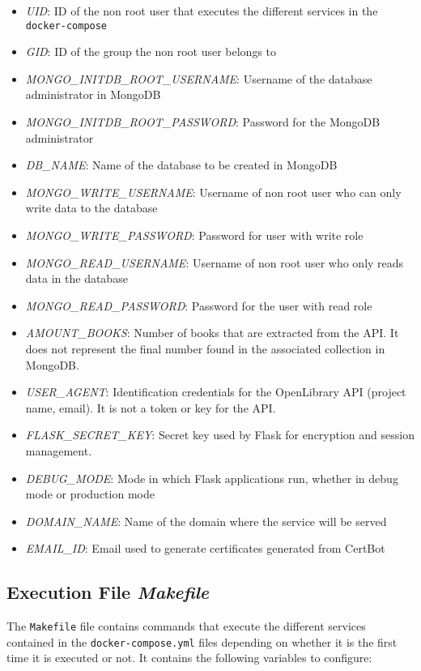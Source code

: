 \documentclass[12pt,a4paper]{article}
\begin{document}
{{            \begin{itemize}[label=$\bullet$]
                \item \emph{UID}: ID of the non root user that executes the different services in the \verb*|docker-compose|
                \item \emph{GID}: ID of the group the non root user belongs to
                \item \emph{MONGO\_INITDB\_ROOT\_USERNAME}: Username of the database administrator in MongoDB
                \item \emph{MONGO\_INITDB\_ROOT\_PASSWORD}: Password for the MongoDB administrator
                \item \emph{DB\_NAME}: Name of the database to be created in MongoDB
                \item \emph{MONGO\_WRITE\_USERNAME}: Username of non root user who can only write data to the database
                \item \emph{MONGO\_WRITE\_PASSWORD}: Password for user with write role
                \item \emph{MONGO\_READ\_USERNAME}: Username of non root user who only reads data in the database
                \item \emph{MONGO\_READ\_PASSWORD}: Password for the user with read role
                \item \emph{AMOUNT\_BOOKS}: Number of books that are extracted from the API. It does not represent the final number found in the associated collection in MongoDB.
                \item \emph{USER\_AGENT}: Identification credentials for the OpenLibrary API (project name, email). It is not a token or key for the API.
                \item \emph{FLASK\_SECRET\_KEY}: Secret key used by Flask for encryption and session management.
                \item \emph{DEBUG\_MODE}: Mode in which Flask applications run, whether in debug mode or production mode
                \item \emph{DOMAIN\_NAME}: Name of the domain where the service will be served
                \item \emph{EMAIL\_ID}: Email used to generate certificates generated from CertBot
            \end{itemize}
        }

        \subsection{Execution File \emph{Makefile}}
        {
            The \verb*|Makefile| file contains commands that execute the different 
            services contained in the \verb*|docker-compose.yml| files depending on 
            whether it is the first time it is executed or not. It contains the 
            following variables to configure:

}}
\end{document}
